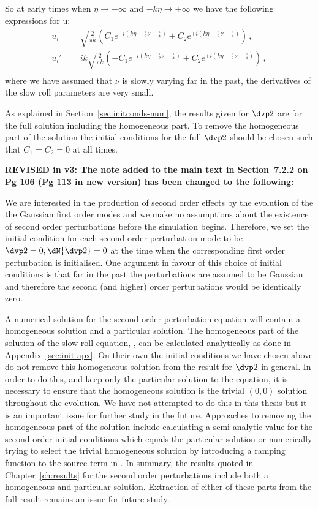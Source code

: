So at early times when $\eta\rightarrow -\infty$ and $-k\eta\rightarrow +\infty$ we have the
following expressions for u:
% 
\begin{align}
 u_{i} &= \sqrt{\frac{2}{\pi k}}\left( C_1 e^{-i(k\eta +\frac{\pi}{2}\nu + \frac{\pi}{4})}
                + C_2 e^{+i(k\eta +\frac{\pi}{2}\nu + \frac{\pi}{4})} \right) \,,\\
 u_{i}' &= i k\sqrt{\frac{2}{\pi k}}\left( -C_1 e^{-i(k\eta +\frac{\pi}{2}\nu + \frac{\pi}{4})}
                + C_2 e^{+i(k\eta +\frac{\pi}{2}\nu + \frac{\pi}{4})} \right) \,,\\
\end{align}
% 
where we have assumed that $\nu$ is slowly varying far in the past, \iec the derivatives of the slow
roll parameters are very small.

As explained in Section~\ref{sec:initconds-num}, the results given for $\dvp2$ are for the full solution
including the homogeneous part. To remove the homogeneous part of the solution the initial conditions
for the full $\dvp2$ should be chosen such that $C_1=C_2=0$ at all times. 

\textbf{REVISED in v3: The note added to the main text in Section~7.2.2 on Pg 106 (Pg 113 in new version)
has been changed to the following:}

%  
We are interested in the production of second order effects by the
evolution of the the Gaussian first order modes and we make no
assumptions about the existence of second order perturbations before
the simulation begins. Therefore, we set the initial condition for each second order
perturbation mode to be $\dvp2=0, \dN{\dvp2}=0$ at
the time when the corresponding first order perturbation is initialised.
One argument in favour of this choice of initial conditions is that far in the past the perturbations
are assumed to be Gaussian and therefore the second (and higher) order perturbations would be identically zero. 
% 

A numerical solution for the second order perturbation equation will contain a homogeneous solution
and a particular solution. 
The homogeneous part of the solution of
the slow roll equation, , can be calculated analytically 
as done in Appendix~\ref{sec:init-apx}. On their own the initial conditions we have chosen above do not  
remove this homogeneous solution from the result for $\dvp2$ in general. In order to do this, and keep only the 
particular solution to the equation, it is necessary to ensure that the homogeneous solution is the trivial $(0,0)$ 
solution throughout the evolution. We have not attempted to do this in this thesis but it is an important
issue for further study in the future. Approaches to removing the homogeneous part of the solution include
calculating a semi-analytic value for the second order initial conditions which equals the particular solution
 or numerically trying to select the trivial
homogeneous solution by introducing a ramping function to the source term in .
In summary, the results quoted in Chapter~\ref{ch:results} for the second order perturbations include both a homogeneous 
and particular solution. Extraction of either of these parts from the full result remains an issue for future study.

